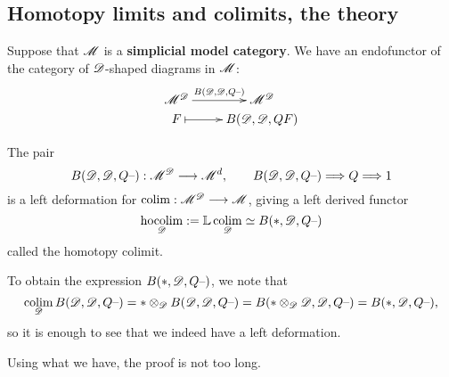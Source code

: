 \documentclass[11pt]{article}
\begin{document}
\begin{6. Homotopy limits and colimits, the theory}
\section*{Homotopy limits and colimits, the theory}
Suppose that $\mathscr{M}$ is a \textbf{simplicial model category}. We have an  endofunctor of the category of $\mathscr{D}$-shaped diagrams in $\mathscr{M}$:
\[\xymatrix@R=0mm{
\ar[r]^-{B(\scrD,\scrD,Q\DASH )}%
\scrM^\scrD&%
\scrM^\scrD\\%
F%
\ar@{|->}[r]&
B(\scrD,\scrD,QF)%
}\]
\begin{thm*}[6.1]
The pair 
\[B(\mathscr{D},\mathscr{D},Q\textup{--} ):\mathscr{M}^{\mathscr{D}}\longrightarrow\mathscr{M}^d,\qquad B(\mathscr{D},\mathscr{D},Q\textup{--} )\Longrightarrow Q\Longrightarrow 1\]
is a left deformation for $\operatorname*{colim}:\mathscr{M}^{\mathscr{D}}\longrightarrow\mathscr{M}$, giving a left derived functor
\[\operatorname*{hocolim}_{\mathscr{D}}:=\mathbb{L}\operatorname*{colim}_{\mathscr{D}} \simeq B(*,\mathscr{D},Q\textup{--} )\]
called the homotopy colimit.
\end{thm*}
\begin{itemise}
\setlength{\parindent}{.25in}
\item To obtain the expression $B(*,\mathscr{D},Q\textup{--} )$, we note that
\[\operatorname*{colim}_{\mathscr{D}} B(\mathscr{D},\mathscr{D},Q\textup{--} )=*\otimes _{\mathscr{D}} B(\mathscr{D},\mathscr{D},Q\textup{--} )=B(*\otimes _{\mathscr{D}}\mathscr{D},\mathscr{D},Q\textup{--} )=B(*,\mathscr{D},Q\textup{--} ),\]
so it is enough to see that we indeed have a left deformation.
\item Using what we have, the proof is not too long.
\end{itemise}
\end{6. Homotopy limits and colimits, the theory}
\end{document}
